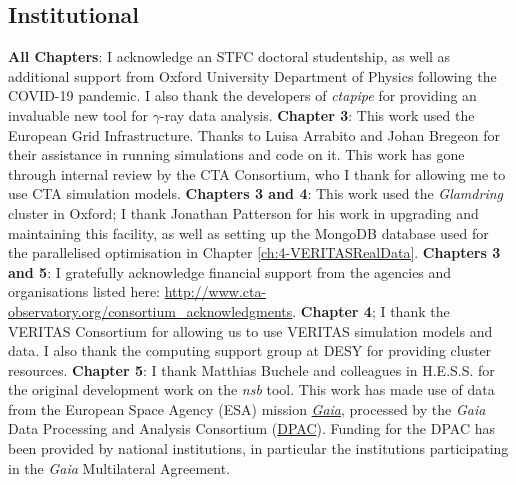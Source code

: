 \newpage

\subsection*{Institutional}
\textbf{All Chapters}: I acknowledge an STFC doctoral studentship, as well as additional support from Oxford University Department of Physics following the COVID-19 pandemic. I also thank the developers of \textit{ctapipe} for providing an invaluable new tool for $\gamma$-ray data analysis. \newline
\textbf{Chapter 3}: This work used the European Grid Infrastructure. Thanks to Luisa Arrabito and Johan Bregeon for their assistance in running simulations and code on it. This work has gone through internal review by the CTA Consortium, who I thank for allowing me to use CTA simulation models. 
\newline
\textbf{Chapters 3 and 4}: This work used the \textit{Glamdring} cluster in Oxford; I thank Jonathan Patterson for his work in upgrading and maintaining this facility, as well as setting up the MongoDB database used for the parallelised optimisation in Chapter \ref{ch:4-VERITASRealData}. 
\newline\textbf{Chapters 3 and 5}:
I gratefully acknowledge financial support from the agencies and organisations listed here: \url{http://www.cta-observatory.org/consortium\_acknowledgments}.
\newline
\textbf{Chapter 4}; I thank the VERITAS Consortium for allowing us to use VERITAS simulation models and data. I also thank the computing support group at DESY for providing cluster resources. \newline
\textbf{Chapter 5}: I thank Matthias Buchele and colleagues in H.E.S.S. for the original development work on the \textit{nsb} tool. This work has made use of data from the European Space Agency (ESA) mission \href{https://www.cosmos.esa.int/gaia}{\textit{Gaia}}, processed by the \textit{Gaia} Data Processing and Analysis Consortium (\href{https://www.cosmos.esa.int/web/gaia/dpac/consortium}{DPAC}). Funding for the DPAC has been provided by national institutions, in particular the institutions participating in the \textit{Gaia} Multilateral Agreement.